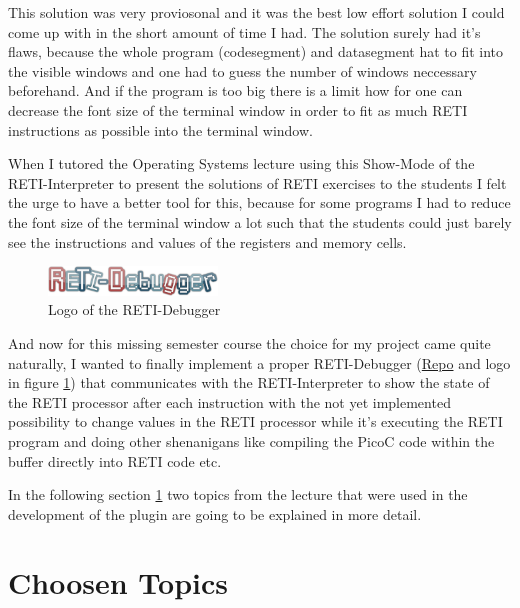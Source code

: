 \documentclass{report}
\begin{document}
This solution was very proviosonal and it was the best low effort solution I could come up with in the short amount of time I had. The solution surely had it's flaws, because the whole program (codesegment) and datasegment hat to fit into the visible windows and one had to guess the number of windows neccessary beforehand. And if the program is too big there is a limit how for one can decrease the font size of the terminal window in order to fit as much RETI instructions as possible into the terminal window.

When I tutored the Operating Systems lecture using this \alert{Show-Mode} of the RETI-Interpreter to present the solutions of RETI exercises to the students I felt the urge to have a better tool for this, because for some programs I had to reduce the font size of the terminal window a lot such that the students could just barely see the instructions and values of the registers and memory cells.

\begin{figure}
	\centering
  \includegraphics[width=0.4\textwidth]{./figures/reti-debugger.png}
	\caption{Logo of the RETI-Debugger}
	\label{fig:logo of the reti debugger}
\end{figure}

And now for this missing semester course the choice for my project came quite naturally, I wanted to finally implement a proper \alert{RETI-Debugger} (\href{https://github.com/freiburg-missing-semester-course/project-matthejue}{Repo} and logo in figure \ref{fig:logo of the reti debugger}) that communicates with the RETI-Interpreter to show the state of the RETI processor after each instruction with the not yet implemented possibility to change values in the RETI processor while it's executing the RETI program and doing other shenanigans like compiling the PicoC code within the buffer directly into RETI code etc.

In the following section \ref{chap:choosen_topics} two topics from the lecture that were used in the development of the plugin are going to be explained in more detail.

\chapter{Choosen Topics}
\label{chap:choosen_topics}
\end{document}
